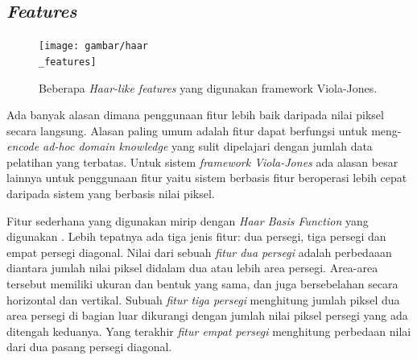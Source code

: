 \subsection{\emph{Features}}

\begin{figure}[H]
  \centering{}
	\texttt{[image: gambar/haar\\\_features]}
  \caption{Beberapa \emph{Haar-like features} yang digunakan framework Viola-Jones.}
\end{figure}

Ada banyak alasan dimana penggunaan fitur lebih baik daripada 
nilai piksel secara langsung. Alasan paling umum adalah fitur dapat berfungsi
untuk meng-\emph{encode ad-hoc domain knowledge} yang sulit dipelajari 
dengan jumlah data pelatihan yang terbatas. Untuk sistem \emph{framework Viola-Jones} 
ada alasan besar lainnya untuk penggunaan fitur yaitu sistem berbasis fitur beroperasi lebih cepat
daripada sistem yang berbasis nilai piksel.

Fitur sederhana yang digunakan mirip dengan \emph{Haar Basis Function} yang 
digunakan \cite{papaetal}. Lebih tepatnya ada tiga jenis fitur: dua persegi, tiga persegi dan 
empat persegi diagonal. 
Nilai dari sebuah \emph{fitur dua persegi} adalah perbedaaan diantara 
jumlah nilai piksel didalam dua atau lebih area persegi. Area-area tersebut memiliki 
ukuran dan bentuk yang sama, dan juga bersebelahan secara horizontal dan vertikal.
Subuah \emph{fitur tiga persegi} menghitung jumlah piksel dua area persegi 
di bagian luar dikurangi dengan jumlah nilai piksel persegi yang ada ditengah keduanya. 
Yang terakhir \emph{fitur empat persegi} menghitung perbedaan nilai dari dua pasang 
persegi diagonal.



